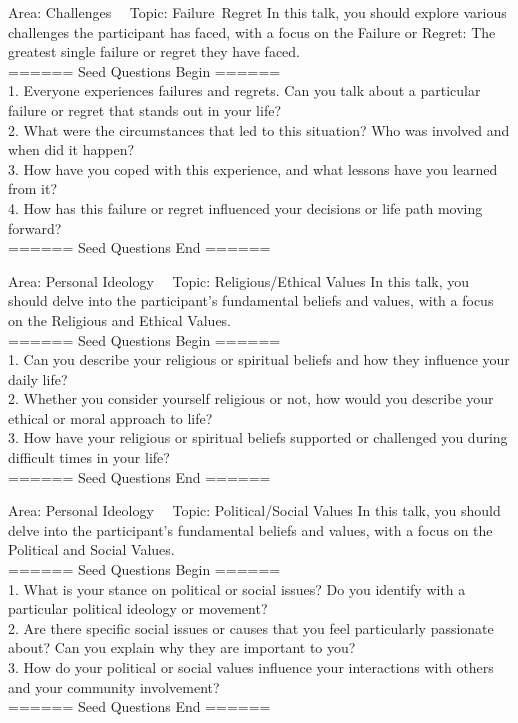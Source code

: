 \begin{mybox}{Area: Challenges \ \ Topic: Failure\, Regret}
In this talk, you should explore various challenges the participant has faced, with a focus on the Failure or Regret: The greatest single failure or regret they have faced. \\
====== Seed Questions Begin ====== \\
1. Everyone experiences failures and regrets. Can you talk about a particular failure or regret that stands out in your life? \\
2. What were the circumstances that led to this situation? Who was involved and when did it happen? \\
3. How have you coped with this experience, and what lessons have you learned from it? \\
4. How has this failure or regret influenced your decisions or life path moving forward? \\
====== Seed Questions End ====== \\
\end{mybox}

\begin{mybox}{Area: Personal Ideology \ \ Topic: Religious/Ethical Values}
In this talk, you should delve into the participant’s fundamental beliefs and values, with a focus on the Religious and Ethical Values. \\
====== Seed Questions Begin ====== \\
1. Can you describe your religious or spiritual beliefs and how they influence your daily life? \\
2. Whether you consider yourself religious or not, how would you describe your ethical or moral approach to life? \\
3. How have your religious or spiritual beliefs supported or challenged you during difficult times in your life? \\
====== Seed Questions End ====== \\
\end{mybox}

\begin{mybox}{Area: Personal Ideology \ \ Topic: Political/Social Values}
In this talk, you should delve into the participant’s fundamental beliefs and values, with a focus on the Political and Social Values. \\
====== Seed Questions Begin ====== \\
1. What is your stance on political or social issues? Do you identify with a particular political ideology or movement? \\
2. Are there specific social issues or causes that you feel particularly passionate about? Can you explain why they are important to you? \\
3. How do your political or social values influence your interactions with others and your community involvement? \\
====== Seed Questions End ====== \\
\end{mybox}

